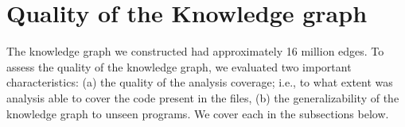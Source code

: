 \section{Quality of the Knowledge graph}
The knowledge graph we constructed had approximately 16 million edges.  To assess the quality of the knowledge graph, we evaluated two important characteristics: (a) the quality of the analysis coverage; i.e., to what extent was analysis able to cover the code present in the files, (b) the generalizability of the knowledge graph to unseen programs.  We cover each in the subsections below.
